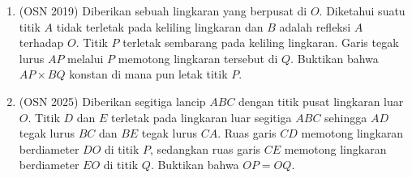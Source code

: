 \documentclass[12pt,a4paper]{article}
\begin{document}
\begin{enumerate}
\item (OSN 2019) Diberikan sebuah lingkaran yang berpusat di $O$. Diketahui suatu titik $A$ tidak terletak pada keliling lingkaran dan $B$ adalah refleksi $A$ terhadap $O$. Titik $P$ terletak sembarang pada keliling lingkaran. Garis tegak lurus $AP$ melalui $P$ memotong lingkaran tersebut di $Q$. Buktikan bahwa $AP \times BQ$ konstan di mana pun letak titik $P$.

\item (OSN 2025) Diberikan segitiga lancip $ABC$ dengan titik pusat lingkaran luar $O$. Titik $D$ dan $E$ terletak pada lingkaran luar segitiga $ABC$ sehingga $AD$ tegak lurus $BC$ dan $BE$ tegak lurus $CA$. Ruas garis $CD$ memotong lingkaran berdiameter $DO$ di titik $P$, sedangkan ruas garis $CE$ memotong lingkaran berdiameter $EO$ di titik $Q$. Buktikan bahwa $OP = OQ$.

\end{enumerate}
\end{document}
